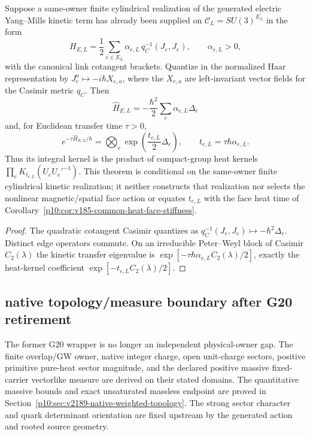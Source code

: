 \documentclass[12pt,a4paper]{article}
\begin{document}
\begin{theorem}
\label{p10:thm:v2159-conditional-electric-heat}
Suppose a same-owner finite cylindrical realization of the generated electric
Yang--Mills kinetic term has already been supplied on
$\mathcal C_L=SU(3)^{E_L}$ in the form
\[
 H_{E,L}=\frac12\sum_{e\in E_L}\alpha_{e,L}\,
 q_C^{-1}(J_e,J_e),
 \qquad \alpha_{e,L}>0,
\]
with the canonical link cotangent brackets.  Quantize in the normalized Haar
representation by $J_e^a\mapsto-i\hbar X_{e,a}$, where the $X_{e,a}$ are
left-invariant vector fields for the Casimir metric $q_C$.  Then
\[
 \boxed{\widehat H_{E,L}
 =-\frac{\hbar^2}{2}\sum_e\alpha_{e,L}\Delta_e}
\]
and, for Euclidean transfer time $\tau>0$,
\[
 e^{-\tau\widehat H_{E,L}/\hbar}
 =\bigotimes_e\exp\!\left(\frac{t_{e,L}}2\Delta_e\right),
 \qquad
 \boxed{t_{e,L}=\tau\hbar\alpha_{e,L}}.
\]
Thus its integral kernel is the product of compact-group heat kernels
$\prod_eK_{t_{e,L}}(U_eU_e'^{-1})$.  This theorem is conditional on the
same-owner finite cylindrical kinetic realization; it neither constructs that
realization nor selects the nonlinear magnetic/spatial face action or equates
$t_{e,L}$ with the face heat time of
Corollary~\ref{p10:cor:v185-common-heat-face-stiffness}.
\end{theorem}
\begin{proof}
The quadratic cotangent Casimir quantizes as
$q_C^{-1}(J_e,J_e)\mapsto-\hbar^2\Delta_e$.  Distinct edge operators
commute.  On an irreducible Peter--Weyl block of Casimir $C_2(\lambda)$ the
kinetic transfer eigenvalue is
$\exp[-\tau\hbar\alpha_{e,L}C_2(\lambda)/2]$, exactly the heat-kernel
coefficient $\exp[-t_{e,L}C_2(\lambda)/2]$.
\end{proof}


\subsection{native topology/measure boundary after G20 retirement}
\label{p10:sec:v161-g20-retirement}
The former G20 wrapper is no longer an independent physical-owner gap.
The finite overlap/GW owner, native integer charge, open unit-charge sectors,
positive primitive pure-heat sector magnitude, and the declared positive
massive fixed-carrier vectorlike measure are derived on their stated
domains. The quantitative massive bounds and exact unsaturated massless
endpoint are proved in Section~\ref{p10:sec:v2189-native-weighted-topology}.  The strong sector character and
quark determinant orientation are fixed upstream by the generated action and
rooted source geometry.
\end{document}
